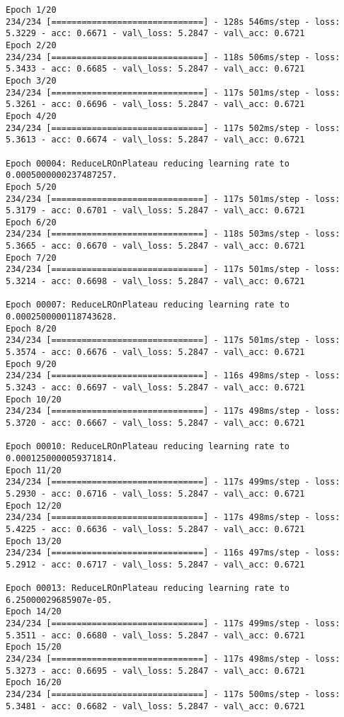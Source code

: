 \documentclass[11pt]{article}
\begin{document}
    \begin{Verbatim}[commandchars=\\\{\}]
Epoch 1/20
234/234 [==============================] - 128s 546ms/step - loss: 5.3229 - acc: 0.6671 - val\_loss: 5.2847 - val\_acc: 0.6721
Epoch 2/20
234/234 [==============================] - 118s 506ms/step - loss: 5.3433 - acc: 0.6685 - val\_loss: 5.2847 - val\_acc: 0.6721
Epoch 3/20
234/234 [==============================] - 117s 501ms/step - loss: 5.3261 - acc: 0.6696 - val\_loss: 5.2847 - val\_acc: 0.6721
Epoch 4/20
234/234 [==============================] - 117s 502ms/step - loss: 5.3613 - acc: 0.6674 - val\_loss: 5.2847 - val\_acc: 0.6721

Epoch 00004: ReduceLROnPlateau reducing learning rate to 0.0005000000237487257.
Epoch 5/20
234/234 [==============================] - 117s 501ms/step - loss: 5.3179 - acc: 0.6701 - val\_loss: 5.2847 - val\_acc: 0.6721
Epoch 6/20
234/234 [==============================] - 118s 503ms/step - loss: 5.3665 - acc: 0.6670 - val\_loss: 5.2847 - val\_acc: 0.6721
Epoch 7/20
234/234 [==============================] - 117s 501ms/step - loss: 5.3214 - acc: 0.6698 - val\_loss: 5.2847 - val\_acc: 0.6721

Epoch 00007: ReduceLROnPlateau reducing learning rate to 0.0002500000118743628.
Epoch 8/20
234/234 [==============================] - 117s 501ms/step - loss: 5.3574 - acc: 0.6676 - val\_loss: 5.2847 - val\_acc: 0.6721
Epoch 9/20
234/234 [==============================] - 116s 498ms/step - loss: 5.3243 - acc: 0.6697 - val\_loss: 5.2847 - val\_acc: 0.6721
Epoch 10/20
234/234 [==============================] - 117s 498ms/step - loss: 5.3720 - acc: 0.6667 - val\_loss: 5.2847 - val\_acc: 0.6721

Epoch 00010: ReduceLROnPlateau reducing learning rate to 0.0001250000059371814.
Epoch 11/20
234/234 [==============================] - 117s 499ms/step - loss: 5.2930 - acc: 0.6716 - val\_loss: 5.2847 - val\_acc: 0.6721
Epoch 12/20
234/234 [==============================] - 117s 498ms/step - loss: 5.4225 - acc: 0.6636 - val\_loss: 5.2847 - val\_acc: 0.6721
Epoch 13/20
234/234 [==============================] - 116s 497ms/step - loss: 5.2912 - acc: 0.6717 - val\_loss: 5.2847 - val\_acc: 0.6721

Epoch 00013: ReduceLROnPlateau reducing learning rate to 6.25000029685907e-05.
Epoch 14/20
234/234 [==============================] - 117s 499ms/step - loss: 5.3511 - acc: 0.6680 - val\_loss: 5.2847 - val\_acc: 0.6721
Epoch 15/20
234/234 [==============================] - 117s 498ms/step - loss: 5.3273 - acc: 0.6695 - val\_loss: 5.2847 - val\_acc: 0.6721
Epoch 16/20
234/234 [==============================] - 117s 500ms/step - loss: 5.3481 - acc: 0.6682 - val\_loss: 5.2847 - val\_acc: 0.6721


\end{Verbatim}
\end{document}
